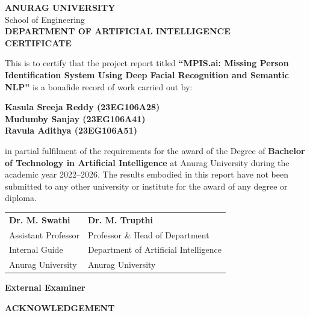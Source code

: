 \documentclass[12pt,a4paper]{report}
\begin{document}
\newpage
\thispagestyle{plain}
\begin{center}
    {\bfseries\Large ANURAG UNIVERSITY}\\[0.05in]
    {\normalsize School of Engineering}\\[0.05in]
    {\bfseries\large DEPARTMENT OF ARTIFICIAL INTELLIGENCE}\\[0.3in]
    {\bfseries\Large CERTIFICATE}\\[0.3in]
\end{center}

\noindent This is to certify that the project report titled \textbf{``MPIS.ai: Missing Person Identification System Using Deep Facial Recognition and Semantic NLP''} is a bonafide record of work carried out by:
\begin{center}
    \textbf{Kasula Sreeja Reddy (23EG106A28)}\\
    \textbf{Mudumby Sanjay (23EG106A41)}\\
    \textbf{Ravula Adithya (23EG106A51)}
\end{center}
in partial fulfilment of the requirements for the award of the Degree of \textbf{Bachelor of Technology in Artificial Intelligence} at Anurag University during the academic year 2022--2026. The results embodied in this report have not been submitted to any other university or institute for the award of any degree or diploma.

\vspace{0.8in}

\noindent
\begin{tabular}{p{2.5in}p{2.5in}}
    \textbf{Dr. M. Swathi} & \textbf{Dr. M. Trupthi} \\
    Assistant Professor & Professor \& Head of Department \\
    Internal Guide & Department of Artificial Intelligence \\
    Anurag University & Anurag University
\end{tabular}

\vspace{0.8in}

\begin{flushright}
    \textbf{External Examiner}
\end{flushright}

\newpage
\thispagestyle{plain}
\begin{center}
    {\bfseries\Large ACKNOWLEDGEMENT}
\end{center}
\vspace{0.2in}
\end{document}
